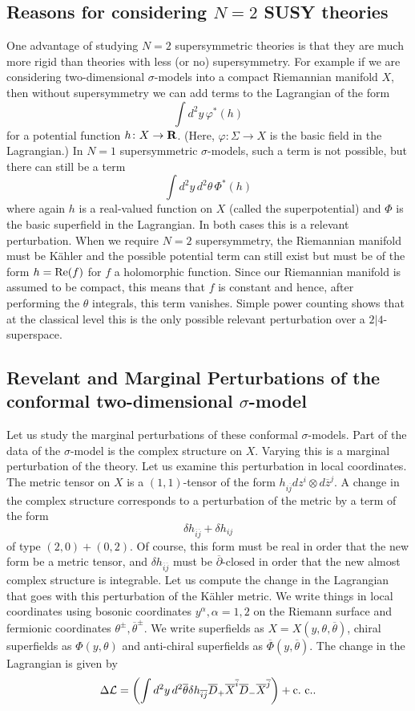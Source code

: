 \subsection{Reasons for considering $N=2$ SUSY theories}

One advantage of studying $N=2$ supersymmetric theories is that they are much
more rigid than theories with less (or no) supersymmetry.
For example if we are considering two-dimensional $\sigma$-models into
a compact Riemannian manifold $X$, then without supersymmetry we can
add terms to the Lagrangian of the form
$$\int d^2y\,\varphi^*(h)$$
for a potential function $h\colon X\to {\bf R}$.
(Here, $\varphi\colon \Sigma\to X$ is the basic field in the
Lagrangian.) In $N=1$ supersymmetric $\sigma$-models, such a term
is not possible, but there can still
be a term
$$\int d^2y\,d^2\theta\,\Phi^*(h)$$
where again $h$ is a real-valued function on $X$ (called the superpotential)
and $\Phi$ is the basic
superfield in the Lagrangian.
In both cases this is a relevant perturbation.
When we require $N=2$ supersymmetry, the Riemannian manifold must be K\"ahler
and the possible potential term can still exist but must be of the
form $h={\rm Re}(f)$ for $f$ a holomorphic function.
Since our Riemannian manifold is assumed to be compact, this means
that $f$ is constant and hence, after performing the $\theta$ integrals,
this term vanishes.
Simple power counting shows that at the classical level
this is the only possible relevant
perturbation over a $2|4$-superspace.

\subsection{Revelant and Marginal Perturbations of the conformal
two-dimensional $\sigma$-model}

Let us study the marginal perturbations of these conformal
$\sigma$-models.
Part of the data of the $\sigma$-model is the complex structure on $X$.
Varying this is a marginal perturbation of the theory.
Let us examine this perturbation
in local coordinates. The metric tensor on $X$ is a $(1,1)$-tensor of the
form $h_{i\overline j}dz^i\otimes d\overline z^j$. A change in the complex
structure corresponds to a perturbation of the metric by a term of the
form
$$\delta h_{\overline i\overline j}+\delta h_{ij}$$
of type $(2,0)+(0,2)$. Of course, this form must be real  in order
that the new form be a metric tensor, and $\delta
h_{\overline i\overline j}$ must be $\overline\partial$-closed in order that
the
new almost complex structure is integrable.
Let us compute the change in the Lagrangian that goes with this
perturbation of the K\"ahler metric. We write things in local
coordinates using bosonic coordinates $y^\alpha, \alpha=1,2$ on the Riemann
surface and fermionic coordinates $\theta^\pm,\overline\theta^\pm$. We
write superfields as $X=X(y,\theta,\overline\theta)$,
chiral superfields as $\Phi(y,\theta)$ and anti-chiral superfields as
$\overline\Phi(y,\overline\theta)$.
The change in the Lagrangian is given by
$$\Delta {\cal L}=\left(\int d^2y\,d^2\overline\theta \delta h_{\overline
i\overline j}\overline D_+\overline X^{\overline i}\overline
D_-\overline X^{\overline j}\right)+{\rm c.\ c.}.$$

